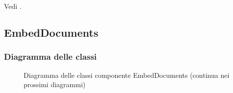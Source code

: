 \documentclass[10pt, a4paper]{article}
\begin{document}
Vedi .



\subsection{EmbedDocuments}
\subsubsection{Diagramma delle classi}


\begin{figure}[H]
    \centering        
    \caption{Diagramma delle classi componente EmbedDocuments (continua nei prossimi diagrammi)}
\end{figure}
\end{document}
